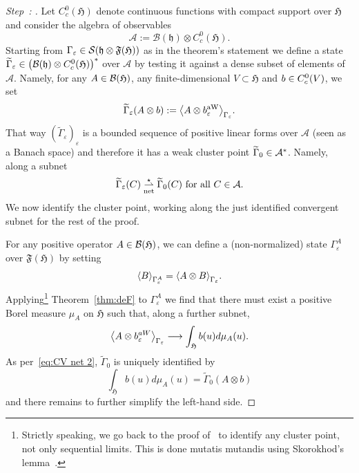 \documentclass[AHL,Unicode,longabstracts,published]{cedram}
\newcommand{\cA}{\mathcal{A}}
\newcommand{\cS}{\mathcal{S}}
\newcommand{\gH}{\mathfrak{H}}
\newcommand{\gF}{\mathfrak{F}}
\newcommand{\gh}{\mathfrak{h}}
\newcommand{\cB}{\mathcal{B}}
\newcommand{\1}{\mathds{1}}
\newcommand{\eps}{\varepsilon}
\newcommand{\Gammat}{\widetilde{\Gamma}}
\newcommand{\cvnet}{\overset{\star}{\underset{\mathrm{net}}{\rightharpoonup}}}
\let\oldin\in
\renewcommand{\in}{\mathchoice{\oldin}{\oldin}{\,\oldin\,}{\,\oldin\,}}
\renewcommand*{\to}{\mathchoice{\longrightarrow}{\rightarrow}{\rightarrow}{\rightarrow}}
\newcounter{setofstep}
\newcounter{step}[setofstep]
\newenvironment{step}[1][]{\refstepcounter{step}\begin{proof}[{Step~\thestep\if#1\empty\else: #1\fi}]}{\let\qed\relax\end{proof}}
\let\originalleft\left
\let\originalright\right
\renewcommand{\left}{\mathopen{}\mathclose\bgroup\originalleft}
\renewcommand{\right}{\aftergroup\egroup\originalright}
\begin{document}
\begin{proofc}
\begin{step}
Let $C^0_c (\gH)$ denote continuous functions with compact support over $\gH$ and consider the algebra of observables
\begin{equation*}
\cA := \cB (\gh) \otimes C^0_c (\gH).
\end{equation*}
Starting from $\Gamma_\eps \in \cS (\gh \otimes \gF (\gH))$ as in the theorem's statement we define a state $\Gammat_\eps\in \left(\cB (\gh) \otimes C^0_c (\gH) \right)^*$ over $\cA$ by testing it against a dense subset of elements of $\cA$. Namely, for any $A \in \cB(\gH)$, any finite-dimensional $V\subset \gH$ and $b\in C^0_c (V)$, we set
\begin{equation*}
\Gammat_\eps (A \otimes b) := \left\langle A \otimes b^{\rm aW}_{\eps} \right\rangle_{\Gamma_\eps}.
\end{equation*}
That way $(\Gammat_\eps)_\eps$ is a bounded sequence of positive linear forms over $\cA$ (seen as a Banach space) and therefore it has a weak cluster point $\Gammat_0 \in \cA ^*$. Namely, along a subnet
\begin{equation}\label{eq:CV net 2}
\Gammat_\eps (C) \cvnet \Gammat_0 (C) \text{ for all } C \in \cA.
\end{equation}
We now identify the cluster point, working along the just identified convergent subnet for the rest of the proof.

For any positive operator $A\in \cB (\gH)$, we can define a (non-normalized) state $\Gamma ^A _\eps$ over $\gF (\gH)$ by setting
\begin{equation*}
\left\langle B \right\rangle_{\Gamma^A_\eps} = \left\langle A \otimes B\right\rangle_{\Gamma_\eps}.
\end{equation*}
Applying\footnote{Strictly speaking, we go back to the proof of~\cite[Item (i)]{LewNamRou-14d} to identify any cluster point, not only sequential limits. This is done mutatis mutandis using Skorokhod's lemma~\cite{Skorokhod-74}.} Theorem~\ref{thm:deF} to $\Gamma ^A _\eps$ we find that there must exist a positive Borel measure $\mu_A$ on $\gH$ such that, along a further subnet,
\begin{equation}\label{eq:CV net 3}
\left\langle A \otimes b_{\eps}^{aW}\right\rangle _{\Gamma_\eps} \to \int_ \gH b(u) d\mu_A (u).
\end{equation}
As per~\eqref{eq:CV net 2}, $\Gammat_0$ is uniquely identified by
\[
\int_ \gH b(u) d\mu_A (u) = \Gammat_0 (A\otimes b)
\]
and there remains to further simplify the left-hand side.


\end{step}
\end{proofc}
\end{document}
